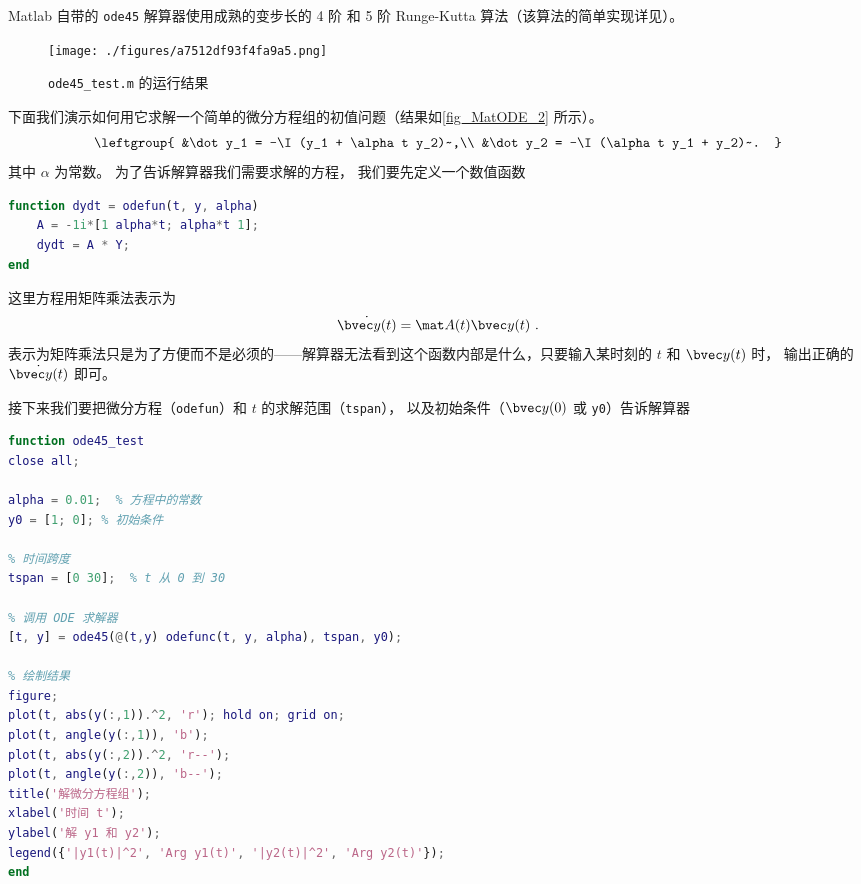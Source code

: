 

Matlab 自带的 \verb`ode45` 解算器使用成熟的变步长的 4 阶 和 5 阶 Runge-Kutta 算法（该算法的简单实现详见）。

\begin{figure}[ht]
\centering
\texttt{[image: ./figures/a7512df93f4fa9a5.png]}
\caption{\verb|ode45_test.m| 的运行结果} \label{fig_MatODE_2}
\end{figure}

下面我们演示如何用它求解一个简单的微分方程组的初值问题（结果如\autoref{fig_MatODE_2} 所示）。
\begin{equation}
\leftgroup{
&\dot y_1 = -\I (y_1 + \alpha t y_2)~,\\
&\dot y_2 = -\I (\alpha t y_1 + y_2)~.
}\end{equation}
其中 $\alpha$ 为常数。 为了告诉解算器我们需要求解的方程， 我们要先定义一个数值函数
\begin{lstlisting}[language=matlab,caption=odefun.m]
function dydt = odefun(t, y, alpha)
    A = -1i*[1 alpha*t; alpha*t 1];
    dydt = A * Y;
end
\end{lstlisting}
这里方程用矩阵乘法表示为
\begin{equation}
\dot{\bvec y(t)} = \mat A(t) \bvec y(t)~.
\end{equation}
表示为矩阵乘法只是为了方便而不是必须的——解算器无法看到这个函数内部是什么，只要输入某时刻的 $t$ 和 $\bvec y(t)$ 时， 输出正确的 $\dot{\bvec y(t)}$ 即可。

接下来我们要把微分方程（\verb`odefun`）和 $t$ 的求解范围（\verb`tspan`）， 以及初始条件（$\bvec y(0)$ 或 \verb`y0`）告诉解算器
\begin{lstlisting}[language=matlab,caption=ode45\_test.m]
function ode45_test
close all;

alpha = 0.01;  % 方程中的常数
y0 = [1; 0]; % 初始条件

% 时间跨度
tspan = [0 30];  % t 从 0 到 30

% 调用 ODE 求解器
[t, y] = ode45(@(t,y) odefunc(t, y, alpha), tspan, y0);

% 绘制结果
figure;
plot(t, abs(y(:,1)).^2, 'r'); hold on; grid on;
plot(t, angle(y(:,1)), 'b');
plot(t, abs(y(:,2)).^2, 'r--');
plot(t, angle(y(:,2)), 'b--');
title('解微分方程组');
xlabel('时间 t');
ylabel('解 y1 和 y2');
legend({'|y1(t)|^2', 'Arg y1(t)', '|y2(t)|^2', 'Arg y2(t)'});
end
\end{lstlisting}

